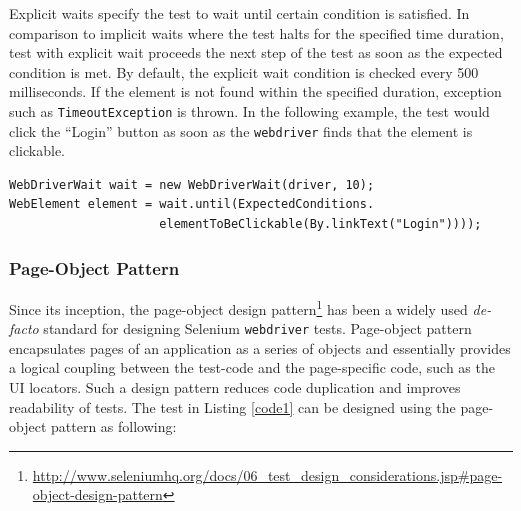 Explicit waits specify the test to wait until certain condition is satisfied. In comparison to implicit waits where the test halts for the specified time duration, test with explicit wait proceeds the next step of the test as soon as the expected condition is met. By default, the explicit wait condition is checked every 500 milliseconds. If the element is not found within the specified duration, exception such as \texttt{TimeoutException} is thrown. In the following example, the test would click the ``Login'' button as soon as the \texttt{webdriver} finds that the element is clickable.
\begin{footnotesize}
\begin{verbatim}
WebDriverWait wait = new WebDriverWait(driver, 10);
WebElement element = wait.until(ExpectedConditions.
                     elementToBeClickable(By.linkText("Login"))));
\end{verbatim}
\end{footnotesize}

\subsubsection{Page-Object Pattern}
\label{page-object}
Since its inception, the page-object design pattern\footnote{\url{http://www.seleniumhq.org/docs/06_test_design_considerations.jsp\#page-object-design-pattern}} has been a widely used \textit{de-facto} standard for designing Selenium \texttt{webdriver} tests. 
Page-object pattern encapsulates pages of an application as a series of objects and essentially provides a logical coupling between the test-code and the page-specific code, such as the UI locators. Such a design pattern reduces code duplication and improves readability of tests. The test in Listing \ref{code1} can be designed using the page-object pattern as following: 

